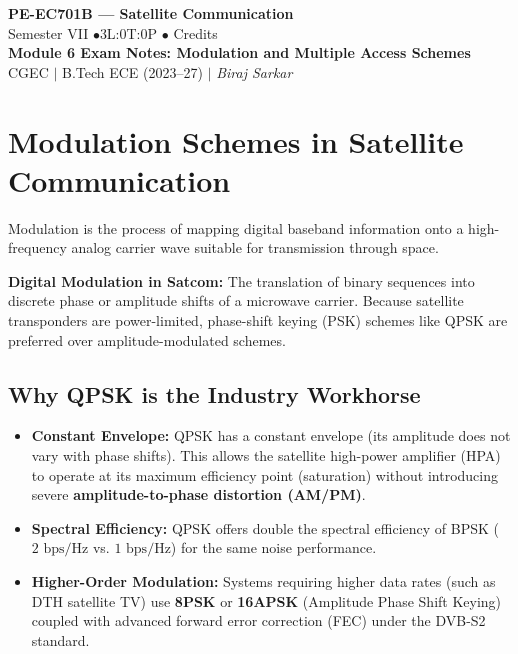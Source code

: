 \documentclass[12pt,a4paper]{article}
\begin{document}

\begin{center}
  {\LARGE\bfseries\color{myred} PE-EC701B --- Satellite Communication}\\[5pt]
  {\normalsize\color{mydark} Semester VII \quad$\bullet$\quad 3L:0T:0P \quad$\bullet$ Credits}\\[3pt]
  {\normalsize\color{myteal}\textbf{Module 6 Exam Notes: Modulation and Multiple Access Schemes}}\\[3pt]
  {\small\color{mydark} CGEC \;$|$\; B.Tech ECE (2023--27) \;$|$\; \textit{Biraj Sarkar}}
\end{center}
\vspace{2pt}
\noindent{\color{myred}\rule{\linewidth}{1.5pt}}
\vspace{2pt}

\hypersetup{linkcolor=mydark}
\tableofcontents
\hypersetup{linkcolor=myteal}
\newpage

\section{Modulation Schemes in Satellite Communication}

Modulation is the process of mapping digital baseband information onto a high-frequency analog carrier wave suitable for transmission through space.

\begin{tcolorbox}[defbox]
\textbf{Digital Modulation in Satcom:} The translation of binary sequences into discrete phase or amplitude shifts of a microwave carrier. Because satellite transponders are power-limited, phase-shift keying (PSK) schemes like QPSK are preferred over amplitude-modulated schemes.
\end{tcolorbox}

\subsection{Why QPSK is the Industry Workhorse}
\begin{itemize}[leftmargin=*, itemsep=3.5pt]
  \item \textbf{Constant Envelope:} QPSK has a constant envelope (its amplitude does not vary with phase shifts). This allows the satellite high-power amplifier (HPA) to operate at its maximum efficiency point (saturation) without introducing severe \textbf{amplitude-to-phase distortion (AM/PM)}.
  \item \textbf{Spectral Efficiency:} QPSK offers double the spectral efficiency of BPSK ($2 \text{ bps/Hz}$ vs. $1 \text{ bps/Hz}$) for the same noise performance.
  \item \textbf{Higher-Order Modulation:} Systems requiring higher data rates (such as DTH satellite TV) use \textbf{8PSK} or \textbf{16APSK} (Amplitude Phase Shift Keying) coupled with advanced forward error correction (FEC) under the DVB-S2 standard.
\end{itemize}
\end{document}
